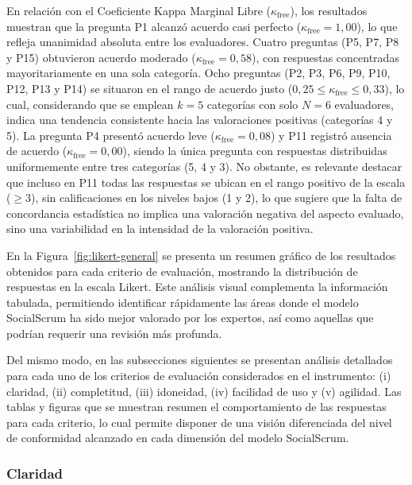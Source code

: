 En relación con el Coeficiente Kappa Marginal Libre ($\kappa_{\text{free}}$), los resultados muestran que la pregunta P1 alcanzó acuerdo casi perfecto ($\kappa_{\text{free}} = 1{,}00$), lo que refleja unanimidad absoluta entre los evaluadores. Cuatro preguntas (P5, P7, P8 y P15) obtuvieron acuerdo moderado ($\kappa_{\text{free}} = 0{,}58$), con respuestas concentradas mayoritariamente en una sola categoría. Ocho preguntas (P2, P3, P6, P9, P10, P12, P13 y P14) se situaron en el rango de acuerdo justo ($0{,}25 \leq \kappa_{\text{free}} \leq 0{,}33$), lo cual, considerando que se emplean $k = 5$ categorías con solo $N = 6$ evaluadores, indica una tendencia consistente hacia las valoraciones positivas (categorías 4 y 5). La pregunta P4 presentó acuerdo leve ($\kappa_{\text{free}} = 0{,}08$) y P11 registró ausencia de acuerdo ($\kappa_{\text{free}} = 0{,}00$), siendo la única pregunta con respuestas distribuidas uniformemente entre tres categorías (5, 4 y 3). No obstante, es relevante destacar que incluso en P11 todas las respuestas se ubican en el rango positivo de la escala ($\geq 3$), sin calificaciones en los niveles bajos (1 y 2), lo que sugiere que la falta de concordancia estadística no implica una valoración negativa del aspecto evaluado, sino una variabilidad en la intensidad de la valoración positiva.

En la Figura~\ref{fig:likert-general} se presenta un resumen gráfico de los resultados obtenidos para cada criterio de evaluación, mostrando la distribución de respuestas en la escala Likert. Este análisis visual complementa la información tabulada, permitiendo identificar rápidamente las áreas donde el modelo SocialScrum ha sido mejor valorado por los expertos, así como aquellas que podrían requerir una revisión más profunda.



Del mismo modo, en las subsecciones siguientes se presentan análisis detallados para cada uno de los criterios de evaluación considerados en el instrumento: (i) claridad, (ii) completitud, (iii) idoneidad, (iv) facilidad de uso y (v) agilidad. Las tablas y figuras que se muestran resumen el comportamiento de las respuestas para cada criterio, lo cual permite disponer de una visión diferenciada del nivel de conformidad alcanzado en cada dimensión del modelo SocialScrum.

\subsubsection{Claridad}

